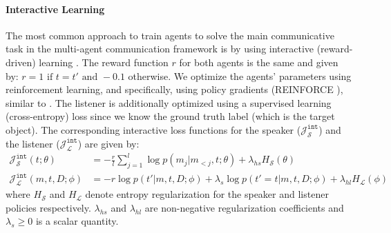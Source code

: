 \documentclass{article}
\begin{document}
\paragraph{Interactive Learning}
The most common approach to train agents to solve the main communicative task in the multi-agent communication framework is by using interactive (reward-driven) learning \citep{evtimova2018emergent,mordatch_emergence_2017,havrylov_emergence_2017,li_ease--teaching_2019}. The reward function $r$ for both agents is the same and given by:
$ r = 1 \mbox{ if } t = t' \mbox{ and } -0.1$ otherwise.
We optimize the agents' parameters using reinforcement learning, and specifically, using policy gradients (REINFORCE \citep{williams1992simple}), similar to \citep{evtimova2018emergent,lazaridou-etal-2020-multi}. The listener is additionally optimized using a supervised learning (cross-entropy) loss since we know the ground truth label (which is the target object). The corresponding interactive loss functions for the speaker ($\mathcal{J}^\texttt{int}_{\mathcal{S}}$) and the listener ($\mathcal{J}^\texttt{int}_{\mathcal{L}}$) are given by:
\begin{align}
\mathcal{J}^\texttt{int}_{\mathcal{S}}(t;\theta) &= -\frac{r}{l} \sum_{j=1}^l \log p(m_j | m_{<j}, t; \theta) + \lambda_{hs} H_\mathcal{S}(\theta) \label{eq:spk_int} \\
\mathcal{J}^\texttt{int}_{\mathcal{L}}(m,t,D;\phi) &= -r \log p(t' | m, t, D; \phi) + \lambda_s \log p(t'=t | m, t, D; \phi) + \lambda_{hl} H_{\mathcal{L}}(\phi) \label{eq:lis_int}
\end{align}
where $H_{\mathcal{S}}$ and $H_{\mathcal{L}}$ denote entropy regularization for the speaker and listener policies respectively. $\lambda_{hs}$ and $\lambda_{hl}$ are non-negative regularization coefficients and $\lambda_s \geq 0$ is a scalar quantity. 
\end{document}

